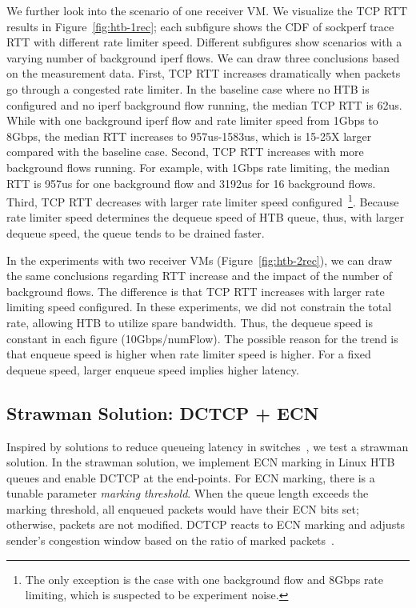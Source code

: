 We further look into the scenario of one receiver VM. 
We visualize the TCP RTT results in Figure~\ref{fig:htb-1rec}; each subfigure shows 
the CDF of sockperf trace RTT with different rate limiter speed. 
Different subfigures show scenarios with a varying number of background iperf flows. 
We can draw three conclusions based on the measurement data. First, TCP RTT increases dramatically when packets go through 
a congested rate limiter. 
In the baseline case where no HTB is configured and no iperf background flow running, the median TCP RTT is 62us. 
While with one background iperf flow and rate limiter speed from 1Gbps to 8Gbps, 
the median RTT increases to 957us-1583us, which is 15-25X larger compared with the baseline case. 
Second, TCP RTT increases with more background flows running. For example, 
with 1Gbps rate limiting, the median RTT is 957us for one background flow and 3192us for 16 background flows. 
Third, TCP RTT decreases with larger rate limiter speed 
configured~\footnote{The only exception is the case with one background flow and 
8Gbps rate limiting, which is suspected to be experiment noise.}. 
Because rate limiter speed determines the dequeue speed of HTB queue, thus, with larger dequeue speed, 
the queue tends to be drained faster. 

In the experiments with two receiver VMs (Figure~\ref{fig:htb-2rec}), we can draw the same conclusions regarding RTT increase 
and the impact of the number of background flows. The difference is that TCP RTT increases with 
larger rate limiting speed configured. In these experiments, we did not constrain the total rate, 
allowing HTB to utilize spare bandwidth. Thus, the dequeue speed is constant in each figure (10Gbps/numFlow). 
The possible reason for the trend is that enqueue speed is higher when rate limiter speed is higher.
For a fixed dequeue speed, larger enqueue speed implies higher latency.

\subsection{Strawman Solution: DCTCP + ECN}

Inspired by solutions to reduce queueing latency in switches~\cite{alizadeh2010data}, 
we test a strawman solution. In the strawman solution, 
we implement ECN marking in Linux HTB queues and enable DCTCP at the end-points. 
For ECN marking, there is a tunable parameter \textemdash\xspace \textit{marking threshold}. 
When the queue length exceeds the marking threshold, 
all enqueued packets would have their ECN bits set; otherwise, packets are not modified. 
DCTCP reacts to ECN marking and adjusts sender's congestion window based on the ratio of marked packets~\cite{alizadeh2010data}.

